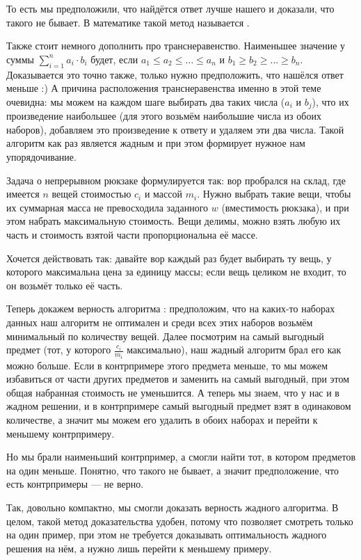 То есть мы предположили, что найдётся ответ лучше нашего и доказали, что такого не бывает. В математике такой метод называется .

Также стоит немного дополнить про транснеравенство. Наименьшее значение у суммы $\sum\limits_{i = 1}^{n} a_i \cdot b_i$ будет, если $a_1 \leq a_2 \leq \ldots \leq a_n$ и $b_1 \geq b_2 \geq \ldots \geq b_n$. Доказывается это точно также, только нужно предположить, что нашёлся ответ меньше :) А причина расположения транснеравенства именно в этой теме очевидна: мы можем на каждом шаге выбирать два таких числа ($a_i$ и $b_j$), что их произведение наибольшее (для этого возьмём наибольшие числа из обоих наборов), добавляем это произведение к ответу и удаляем эти два числа. Такой алгоритм как раз является жадным и при этом формирует нужное нам упорядочивание.


Задача о непрерывном рюкзаке формулируется так: вор пробрался на склад, где имеется $n$ вещей стоимостью $c_i$ и массой $m_i$. Нужно выбрать такие вещи, чтобы их суммарная масса не превосходила заданного $w$ (вместимость рюкзака), и при этом набрать максимальную стоимость. Вещи делимы, можно взять любую их часть и стоимость взятой части пропорциональна её массе.

Хочется действовать так: давайте вор каждый раз будет выбирать ту вещь, у которого максимальна цена за единицу массы; если вещь целиком не входит, то он возьмёт только её часть.

Теперь докажем верность алгоритма : предположим, что на каких-то наборах данных наш алгоритм не оптимален и среди всех этих наборов возьмём минимальный по количеству вещей. Далее посмотрим на самый выгодный предмет (тот, у которого $\frac{c_i}{m_i}$ максимально), наш жадный алгоритм брал его как можно больше. Если в контрпримере этого предмета меньше, то мы можем избавиться от части других предметов и заменить на самый выгодный, при этом общая набранная стоимость не уменьшится. А теперь мы знаем, что у нас и в жадном решении, и в контрпримере самый выгодный предмет взят в одинаковом количестве, а значит мы можем его удалить в обоих наборах и перейти к меньшему контрпримеру.

Но мы брали наименьший контрпример, а смогли найти тот, в котором предметов на один меньше. Понятно, что такого не бывает, а значит предположение, что есть контрпримеры — не верно.

Так, довольно компактно, мы смогли доказать верность жадного алгоритма. В целом, такой метод доказательства удобен, потому что позволяет смотреть только на один пример, при этом не требуется доказывать оптимальность жадного решения на нём, а нужно лишь перейти к меньшему примеру.

